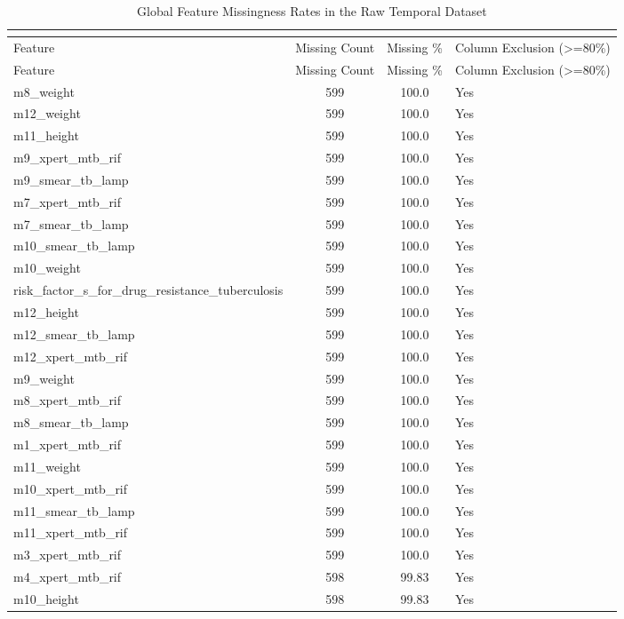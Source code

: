 \small
\setlength{\tabcolsep}{3pt}
\begin{longtable}[l]{>{\raggedright\arraybackslash}p{}cc>{\centering\arraybackslash}p{}}
\caption{Global Feature Missingness Rates in the Raw Temporal Dataset} \\
\label{tab:raw_missingness_summary} \\
\toprule
Feature & Missing Count & Missing \% & Column Exclusion (>=80\%) \\
\midrule
\endfirsthead
\toprule
Feature & Missing Count & Missing \% & Column Exclusion (>=80\%) \\
\midrule
\endhead
\midrule
\endfoot
\bottomrule
\endlastfoot
m8\_weight & 599 & 100.0 & Yes \\
m12\_weight & 599 & 100.0 & Yes \\
m11\_height & 599 & 100.0 & Yes \\
m9\_xpert\_mtb\_rif & 599 & 100.0 & Yes \\
m9\_smear\_tb\_lamp & 599 & 100.0 & Yes \\
m7\_xpert\_mtb\_rif & 599 & 100.0 & Yes \\
m7\_smear\_tb\_lamp & 599 & 100.0 & Yes \\
m10\_smear\_tb\_lamp & 599 & 100.0 & Yes \\
m10\_weight & 599 & 100.0 & Yes \\
risk\_factor\_s\_for\_drug\_resistance\_tuberculosis & 599 & 100.0 & Yes \\
m12\_height & 599 & 100.0 & Yes \\
m12\_smear\_tb\_lamp & 599 & 100.0 & Yes \\
m12\_xpert\_mtb\_rif & 599 & 100.0 & Yes \\
m9\_weight & 599 & 100.0 & Yes \\
m8\_xpert\_mtb\_rif & 599 & 100.0 & Yes \\
m8\_smear\_tb\_lamp & 599 & 100.0 & Yes \\
m1\_xpert\_mtb\_rif & 599 & 100.0 & Yes \\
m11\_weight & 599 & 100.0 & Yes \\
m10\_xpert\_mtb\_rif & 599 & 100.0 & Yes \\
m11\_smear\_tb\_lamp & 599 & 100.0 & Yes \\
m11\_xpert\_mtb\_rif & 599 & 100.0 & Yes \\
m3\_xpert\_mtb\_rif & 599 & 100.0 & Yes \\
m4\_xpert\_mtb\_rif & 598 & 99.83 & Yes \\
m10\_height & 598 & 99.83 & Yes \\

\end{longtable}
